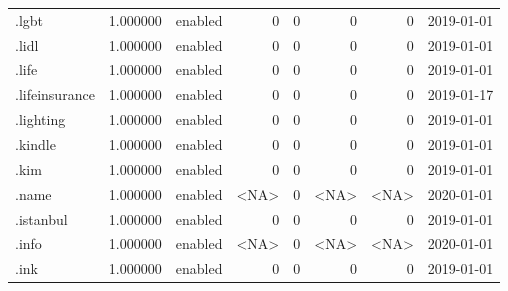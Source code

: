 \begin{tabular}{lrlrrrrl}
.lgbt                     &          1.000000 &         enabled &                           0 &                           0 &                           0 &                   0 &           2019-01-01 \\
.lidl                     &          1.000000 &         enabled &                           0 &                           0 &                           0 &                   0 &           2019-01-01 \\
.life                     &          1.000000 &         enabled &                           0 &                           0 &                           0 &                   0 &           2019-01-01 \\
.lifeinsurance            &          1.000000 &         enabled &                           0 &                           0 &                           0 &                   0 &           2019-01-17 \\
.lighting                 &          1.000000 &         enabled &                           0 &                           0 &                           0 &                   0 &           2019-01-01 \\
.kindle                   &          1.000000 &         enabled &                           0 &                           0 &                           0 &                   0 &           2019-01-01 \\
.kim                      &          1.000000 &         enabled &                           0 &                           0 &                           0 &                   0 &           2019-01-01 \\
.name                     &          1.000000 &         enabled &                        <NA> &                           0 &                        <NA> &                <NA> &           2020-01-01 \\
.istanbul                 &          1.000000 &         enabled &                           0 &                           0 &                           0 &                   0 &           2019-01-01 \\
.info                     &          1.000000 &         enabled &                        <NA> &                           0 &                        <NA> &                <NA> &           2020-01-01 \\
.ink                      &          1.000000 &         enabled &                           0 &                           0 &                           0 &                   0 &           2019-01-01 \\

\end{tabular}
